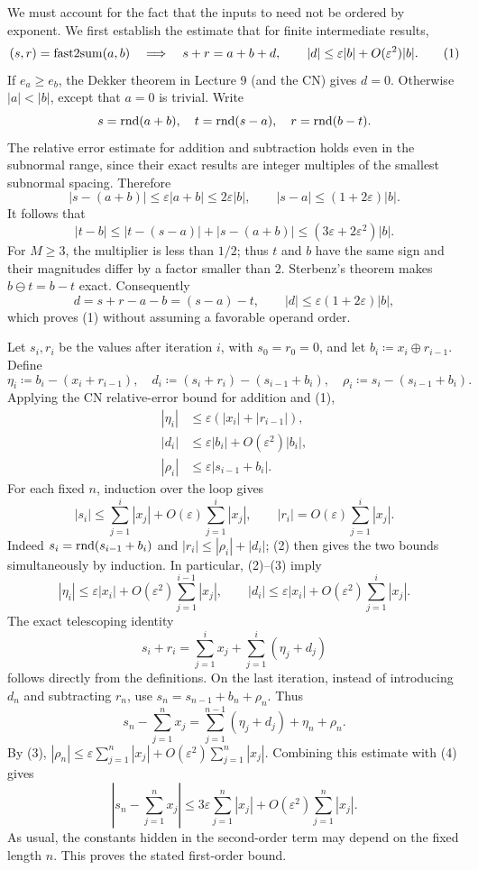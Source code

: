 \documentclass[11pt,oneside]{article}
\begin{document}
\begin{solution}
We must account for the fact that the inputs to  need
not be ordered by exponent. We first establish the estimate that
for finite intermediate results,
\[
 (s, r)=\operatorname{fast2sum}(a, b)
 \quad\Longrightarrow\quad
 s+r=a+b+d,
 \qquad |d|\le\varepsilon|b|+O(\varepsilon^2)|b|.
 \tag{1}
\]
If $e_a\ge e_b$, the Dekker theorem in Lecture 9 (and the CN)
gives $d=0$. Otherwise $|a|<|b|$, except that $a=0$ is
trivial. Write
\[
 s=\operatorname{rnd}(a+b), \quad t=\operatorname{rnd}(s-a), \quad r=\operatorname{rnd}(b-t).
\]
The relative error estimate for addition and subtraction holds even
in the subnormal range, since their exact results are integer
multiples of the smallest subnormal spacing. Therefore
\[
 |s-(a+b)|\le\varepsilon|a+b|
 \le2\varepsilon|b|,
 \qquad
 |s-a|\le(1+2\varepsilon)|b|.
\]
It follows that
\[
 |t-b|\le
 |t-(s-a)|+|s-(a+b)|
 \le(3\varepsilon+2\varepsilon^2)|b|.
\]
For $M\ge3$, the multiplier is less than $1/2$; thus $t$ and
$b$ have the same sign and their magnitudes differ by a factor
smaller than $2$. Sterbenz's theorem makes $b\ominus t=b-t$
exact. Consequently
\[
 d=s+r-a-b=(s-a)-t,
 \qquad |d|\le\varepsilon(1+2\varepsilon)|b|,
\]
which proves (1) without assuming a favorable operand order.

Let $s_i, r_i$ be the values after iteration $i$, with
$s_0=r_0=0$, and let
$b_i\coloneqq x_i\oplus r_{i-1}$. Define
\[
 \eta_i\coloneqq b_i-(x_i+r_{i-1}),
 \quad d_i\coloneqq(s_i+r_i)-(s_{i-1}+b_i),
 \quad \rho_i\coloneqq s_i-(s_{i-1}+b_i).
\]
Applying the CN relative-error bound for addition and (1),
\[
 \begin{aligned}
 |\eta_i|&\le\varepsilon(|x_i|+|r_{i-1}|), \\
 |d_i|&\le\varepsilon|b_i|+O(\varepsilon^2)|b_i|, \\
 |\rho_i|&\le\varepsilon|s_{i-1}+b_i|.
 \end{aligned}
 \tag{2}
\]
For each fixed $n$, induction over the loop gives
\[
 |s_i|\le\sum_{j=1}^{i}|x_j|+O(\varepsilon)
 \sum_{j=1}^{i}|x_j|,
 \qquad
 |r_i|=O(\varepsilon)\sum_{j=1}^{i}|x_j|.
 \tag{3}
\]
Indeed $s_i=\operatorname{rnd}(s_{i-1}+b_i)$ and
$|r_i|\le|\rho_i|+|d_i|$; (2) then gives the two bounds
simultaneously by induction. In particular, (2)--(3) imply
\[
 |\eta_i|\le\varepsilon|x_i|
 +O(\varepsilon^2)\sum_{j=1}^{i-1}|x_j|,
 \qquad
 |d_i|\le\varepsilon|x_i|
 +O(\varepsilon^2)\sum_{j=1}^{i}|x_j|.
 \tag{4}
\]
The exact telescoping identity
\[
 s_i+r_i=\sum_{j=1}^{i}x_j
  +\sum_{j=1}^{i}(\eta_j+d_j)
\]
follows directly from the definitions. On the last iteration, instead
of introducing $d_n$ and subtracting $r_n$, use
$s_n=s_{n-1}+b_n+\rho_n$. Thus
\[
 s_n-\sum_{j=1}^{n}x_j
 =\sum_{j=1}^{n-1}(\eta_j+d_j)+\eta_n+\rho_n.
\]
By (3),
$|\rho_n|\le\varepsilon\sum_{j=1}^{n}|x_j|
+O(\varepsilon^2)\sum_{j=1}^{n}|x_j|$.
Combining this estimate with (4) gives
\[
 \boxed{\left|s_n-\sum_{j=1}^{n}x_j\right|
 \le3\varepsilon\sum_{j=1}^{n}|x_j|
 +O(\varepsilon^2)\sum_{j=1}^{n}|x_j|.}
\]
As usual, the constants hidden in the second-order term may depend
on the fixed length $n$. This proves the stated first-order bound.
\end{solution}
\end{document}
